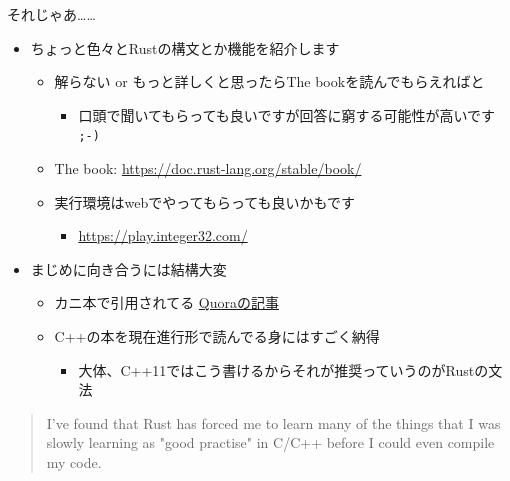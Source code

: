 \documentclass[cjk,dvipdfmx,10pt,compress,fragile%
hyperref={bookmarks=true,bookmarksnumbered=true,bookmarksopen=false,%
colorlinks=false,%
pdftitle={第 134 回 関西 Debian 勉強会},%
pdfauthor={小林},%
pdfsubject={資料},%
}]{beamer}
\begin{document}
\begin{frame}[t,fragile]{それじゃあ……}
\begin{itemize}
 \item ちょっと色々とRustの構文とか機能を紹介します
       \begin{itemize}
	\item 解らない or もっと詳しくと思ったらThe bookを読んでもらえればと
	      \begin{itemize}
	       \item 口頭で聞いてもらっても良いですが回答に窮する可能性が高いです \verb|;-)|
	      \end{itemize}
	\item The book: \url{https://doc.rust-lang.org/stable/book/}
	\item 実行環境はwebでやってもらっても良いかもです
	      \begin{itemize}
	       \item \url{https://play.integer32.com/}
	      \end{itemize}
       \end{itemize}
 \item まじめに向き合うには結構大変
       \begin{itemize}
	\item カニ本で引用されてる
	      \href{https://www.quora.com/What-do-C-C++-systems-programmers-think-of-Rust/answer/Mitchell-Nordine}{Quoraの記事}
	\item C++の本を現在進行形で読んでる身にはすごく納得
	      \begin{itemize}
	       \item 大体、C++11ではこう書けるからそれが推奨っていうのがRustの文法
	      \end{itemize}
       \end{itemize}
\end{itemize}
\begin{quote}
I've found that Rust has forced me to learn many of the things that I was slowly learning as "good practise" in C/C++ before I could even compile my code.
\end{quote}
\end{frame}
\end{document}
